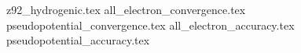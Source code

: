 \documentclass[11pt]{article}
\begin{document}
    {z92_hydrogenic.tex}
    \FloatBarrier
    {all_electron_convergence.tex}
    \FloatBarrier
    {pseudopotential_convergence.tex}
    \FloatBarrier
    {all_electron_accuracy.tex}
    \FloatBarrier
    {pseudopotential_accuracy.tex}
\end{document}
